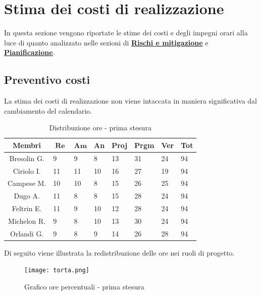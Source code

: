 \documentclass[10pt, a4paper]{article}
\begin{document}
{{{{{{\section{Stima dei costi di realizzazione}
In questa sezione vengono riportate le stime dei costi e degli impegni orari alla luce di quanto analizzato nelle sezioni di \hyperref[section:Rischi]{\textbf{Rischi e mitigazione}} e \hyperref[section:Pianificazione]{\textbf{Pianificazione}}.

\subsection{Preventivo costi}
La stima dei costi di realizzazione non viene intaccata in maniera significativa dal cambiamento del calendario.

{\renewcommand{\arraystretch}{1.2}
\begin{table}[H]
\begin{tabularx}{\textwidth}{c|X|X|X|X|X|X|X}
        \textbf{Membri} & $\operatorname{\textbf{Re}}$ & $\mathrm{\textbf{Am}}$ & \textbf{An} & \textbf{Proj} & \textbf{Prgm} & \textbf{Ver} & \textbf{Tot} \\
        \hline Bresolin G. & 9 & 9 & 8 & 13 & 31 & 24 & 94 \\
        \hline Ciriolo I. & 11 & 11 & 10 & 16 & 27 & 19 & 94 \\
        \hline Campese M. & 10 & 10 & 8 & 15 & 26 & 25 & 94 \\
        \hline Dugo A. & 11 & 8 & 8 & 15 & 28 & 24 & 94 \\
        \hline Feltrin E. & 11 & 9 & 10 & 12 & 28 & 24 & 94 \\
        \hline Michelon R. & 9 & 8 & 10 & 13 & 30 & 24 & 94 \\
        \hline Orlandi G. & 9 & 8 & 9 & 14 & 26 & 28 & 94 
    \end{tabularx}
    \caption{Distribuzione ore - prima stesura}
    \end{table}

 Di seguito viene illustrata la redistribuzione delle ore nei ruoli di progetto.
    \begin{figure}[H]
        \centering               
        \texttt{[image: torta.png]}
         \caption{Grafico ore percentuali - prima stesura}
    \end{figure}

}}}}}}}
\end{document}

